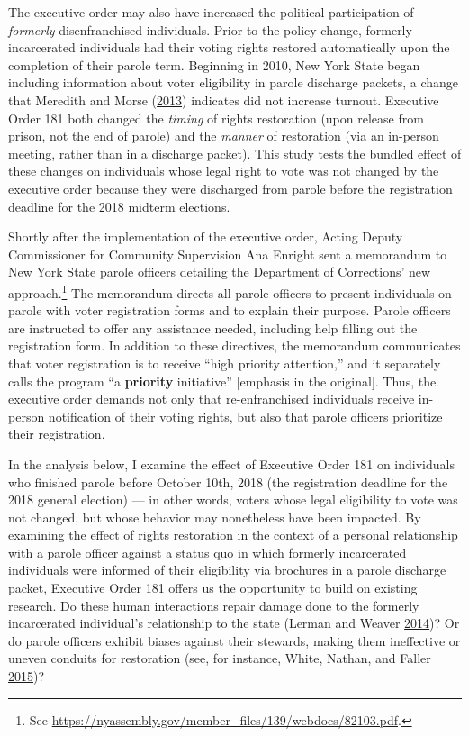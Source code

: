 \documentclass[
  12pt,
]{article}
\begin{document}
The executive order may also have increased the political participation of \emph{formerly} disenfranchised individuals. Prior to the policy change, formerly incarcerated individuals had their voting rights restored automatically upon the completion of their parole term. Beginning in 2010, New York State began including information about voter eligibility in parole discharge packets, a change that Meredith and Morse (\protect\hyperlink{ref-Meredith2013}{2013}) indicates did not increase turnout. Executive Order 181 both changed the \emph{timing} of rights restoration (upon release from prison, not the end of parole) and the \emph{manner} of restoration (via an in-person meeting, rather than in a discharge packet). This study tests the bundled effect of these changes on individuals whose legal right to vote was not changed by the executive order because they were discharged from parole before the registration deadline for the 2018 midterm elections.

Shortly after the implementation of the executive order, Acting Deputy Commissioner for Community Supervision Ana Enright sent a memorandum to New York State parole officers detailing the Department of Corrections' new approach.\footnote{See \url{https://nyassembly.gov/member_files/139/webdocs/82103.pdf}.} The memorandum directs all parole officers to present individuals on parole with voter registration forms and to explain their purpose. Parole officers are instructed to offer any assistance needed, including help filling out the registration form. In addition to these directives, the memorandum communicates that voter registration is to receive ``high priority attention,'' and it separately calls the program ``a \textbf{priority} initiative'' {[}emphasis in the original{]}. Thus, the executive order demands not only that re-enfranchised individuals receive in-person notification of their voting rights, but also that parole officers prioritize their registration.

In the analysis below, I examine the effect of Executive Order 181 on individuals who finished parole before October 10th, 2018 (the registration deadline for the 2018 general election) --- in other words, voters whose legal eligibility to vote was not changed, but whose behavior may nonetheless have been impacted. By examining the effect of rights restoration in the context of a personal relationship with a parole officer against a status quo in which formerly incarcerated individuals were informed of their eligibility via brochures in a parole discharge packet, Executive Order 181 offers us the opportunity to build on existing research. Do these human interactions repair damage done to the formerly incarcerated individual's relationship to the state (Lerman and Weaver \protect\hyperlink{ref-Lerman2014}{2014})? Or do parole officers exhibit biases against their stewards, making them ineffective or uneven conduits for restoration (see, for instance, White, Nathan, and Faller \protect\hyperlink{ref-White2015}{2015})?
\end{document}
